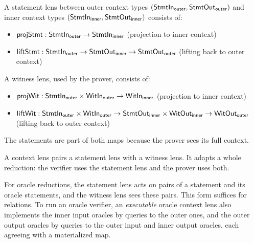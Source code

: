 \begin{definition}
    \label{def:statement_lens}
    A statement lens between outer context types $(\mathsf{StmtIn}_{\mathsf{outer}}, \mathsf{StmtOut}_{\mathsf{outer}})$ and inner context types $(\mathsf{StmtIn}_{\mathsf{inner}}, \mathsf{StmtOut}_{\mathsf{inner}})$ consists of:
    \begin{itemize}
        \item $\mathsf{projStmt} : \mathsf{StmtIn}_{\mathsf{outer}} \to \mathsf{StmtIn}_{\mathsf{inner}}$ (projection to inner context)
        \item $\mathsf{liftStmt} : \mathsf{StmtIn}_{\mathsf{outer}} \to \mathsf{StmtOut}_{\mathsf{inner}} \to \mathsf{StmtOut}_{\mathsf{outer}}$ (lifting back to outer context)
    \end{itemize}
    \leanok
\end{definition}

\begin{definition}
    \label{def:witness_lens}
    A witness lens, used by the prover, consists of:
    \begin{itemize}
        \item $\mathsf{projWit} : \mathsf{StmtIn}_{\mathsf{outer}} \times \mathsf{WitIn}_{\mathsf{outer}} \to \mathsf{WitIn}_{\mathsf{inner}}$ (projection to inner context)
        \item $\mathsf{liftWit} : \mathsf{StmtIn}_{\mathsf{outer}} \times \mathsf{WitIn}_{\mathsf{outer}} \to \mathsf{StmtOut}_{\mathsf{inner}} \times \mathsf{WitOut}_{\mathsf{inner}} \to \mathsf{WitOut}_{\mathsf{outer}}$ (lifting back to outer context)
    \end{itemize}
    The statements are part of both maps because the prover sees its full context.
    \leanok
\end{definition}

\begin{definition}
    \label{def:context_lens}
    A context lens pairs a statement lens with a witness lens. It adapts a whole reduction: the
    verifier uses the statement lens and the prover uses both.
    \leanok
\end{definition}

\begin{definition}
    \label{def:oracle_context_lens}
    For oracle reductions, the statement lens acts on pairs of a statement and its oracle
    statements, and the witness lens sees these pairs. This form suffices for relations. To run an
    oracle verifier, an \emph{executable} oracle context lens also implements the inner input
    oracles by queries to the outer ones, and the outer output oracles by queries to the outer
    input and inner output oracles, each agreeing with a materialized map.
    \leanok
\end{definition}

